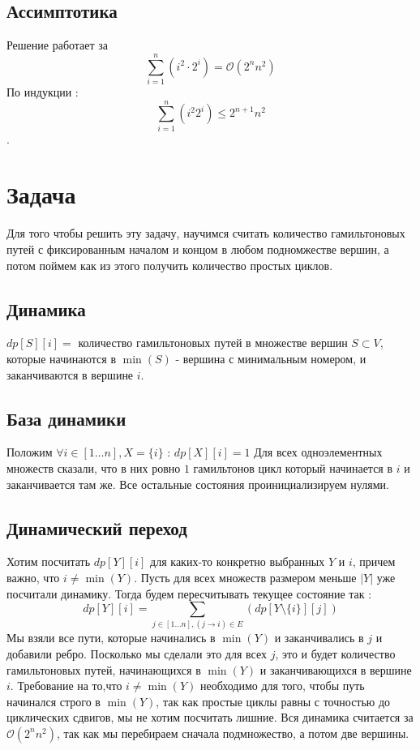\documentclass{article}
\begin{document}
\subsection*{Ассимптотика}
Решение работает за $$\sum_{i = 1}^{n}(i^{2}\cdot2^{i}) = \mathcal{O}(2^{n}n^{2})$$
\newline
По индукции :  $$\sum_{i = 1}^{n}(i^{2}2^{i}) \leq 2^{n + 1}n^{2}$$.
\section*{Задача }
Для того чтобы решить эту задачу, научимся считать количество гамильтоновых путей с фиксированным началом и концом в любом подномжестве вершин, а потом поймем как из этого получить количество простых циклов.
\newline
\subsection*{Динамика}
$dp[S][i] = $ количество гамильтоновых путей в множестве вершин $S \subset V$, которые начинаются в $\min(S)$ - вершина с минимальным номером, и заканчиваются в вершине $i$.
\subsection*{База динамики}
Положим $\forall i \in [1\dots n], X = \{i\}$ : $dp[X][i] = 1$ 
Для всех одноэлементных множеств сказали, что в них ровно $1$ гамильтонов цикл который начинается в $i$ и заканчивается там же.
Все остальные состояния проинициализируем нулями.
\subsection*{Динамический переход}
Хотим посчитать $dp[Y][i]$ для каких-то конкретно выбранных $Y$ и $i$, причем важно, что $i \neq \min(Y)$. Пусть для всех множеств размером меньше $|Y|$ уже посчитали динамику.
Тогда будем пересчитывать текущее состояние так :
$$dp[Y][i] = \sum_{j \in [1\dots n], (j \to i) \in E}(dp[Y \setminus \{i\}][j])$$
Мы взяли все пути, которые начинались в $\min(Y)$ и заканчивались в $j$ и добавили ребро. Посколько мы сделали это для всех $j$, это и будет количество гамильтоновых путей, начинающихся в $\min(Y)$ и заканчивающихся в вершине $i$.
\newline
Требование на то,что $i \neq \min(Y)$ необходимо для того, чтобы путь начинался строго в $\min(Y)$, так как простые циклы равны с точностью до циклических сдвигов, мы не хотим посчитать лишние.
\newline
Вся динамика считается за $\mathcal{O}(2^{n}n^{2})$, так как мы перебираем сначала подмножество, а потом две вершины.
\end{document}

